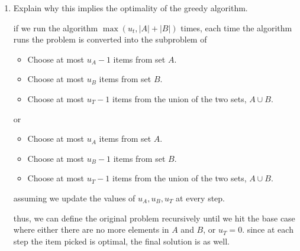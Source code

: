 \documentclass[letterpaper,12pt]{article}
\begin{document}
\begin{enumerate}
\begin{enumerate}
    \item Explain why this implies the optimality of the greedy algorithm. 
    
    if we run the algorithm \(\max(u_t,\lvert A\rvert + \lvert B\rvert)\) times, each time the algorithm runs the problem is converted into the subproblem of
    
    \begin{itemize}
    \item Choose at most $u_A-1$ items from set $A$.
    \item Choose at most $u_B$ items from set $B$.
    \item Choose at most $u_T-1$ items from the union of the two sets, $A \cup B$.
\end{itemize}

    or 
    \begin{itemize}
    \item Choose at most $u_A$ items from set $A$.
    \item Choose at most $u_B-1$ items from set $B$.
    \item Choose at most $u_T-1$ items from the union of the two sets, $A \cup B$.
\end{itemize}

    assuming we update the values of \(u_A,u_B,u_T\) at every step. 

    thus, we can define the original problem recursively until we hit the base case where either there are no more elements in \(A\) and \(B\), or \(u_T=0\). since at each step the item picked is optimal, the final solution is as well. 
    
    
\end{enumerate}






\end{enumerate}
\end{document}
